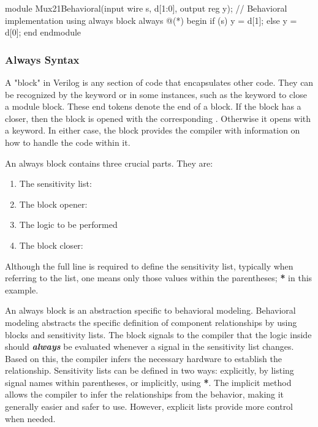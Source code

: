 \documentclass[12pt]{labmanual}
\begin{document}
\begin{codeblock}[language=verilog]
module Mux21Behavioral(input wire s, d[1:0], output reg y);
  // Behavioral implementation using always block
  always @(*)
  begin
    if (s)
      y = d[1];
    else
      y = d[0];
  end
endmodule
\end{codeblock}

\subsubsection{Always Syntax}
A "block" in Verilog is any section of code that encapsulates other code. They can be recognized by the keyword  or  in some instances, such as the keyword  to close a module block. These end tokens denote the end of a block. If the block has a  closer, then the block is opened with the corresponding . Otherwise it opens with a  keyword. In either case, the block provides the compiler with information on how to handle the code within it.


An always block contains three crucial parts. They are:

\begin{enumerate}
    \item The sensitivity list: 
    \item The block opener: 
    \item The logic to be performed 
    \item The block closer: 
\end{enumerate}

Although the full line  is required to define the sensitivity list, typically when referring to the list, one means only those values within the parentheses; \textbf{*} in this example.

An always block is an abstraction specific to behavioral modeling. Behavioral modeling abstracts the specific definition of component relationships by using  blocks and sensitivity lists. The  block signals to the compiler that the logic inside should \textbf{\textit{always}} be evaluated whenever a signal in the sensitivity list changes. Based on this, the compiler infers the necessary hardware to establish the relationship. Sensitivity lists can be defined in two ways: explicitly, by listing signal names within parentheses, or implicitly, using \textbf{*}. The implicit method allows the compiler to infer the relationships from the behavior, making it generally easier and safer to use. However, explicit lists provide more control when needed.
\end{document}
